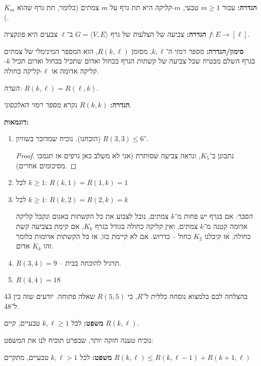 \documentclass[]{article}
\newcommand\ml    {\ell}
\newcommand\ra    {\rangle}
\newcommand\la    {\langle}
\begin{document}
	\textbf{הגדרה: }עבור $m \ge 1$ טבעי, $m$\textit{-קליקה} היא תת גרף על $m$ צמתים (כלומר, תת גרף שהוא $K_m$). 
	
	\textbf{הגדרה: }\textit{צביעה} של הצלעות של גרף $G = \la V, E \ra$ ב־$\ell$ צבעים היא פונקציה $f \colon E \to [\ml]$. 
	
	\textbf{סימון/הגדרה: }\textit{מספר רמזי} ה־$k, \ml$, מסומן $R(k, \ml)$, הוא המספר המינימלי של צמתים בגרף השלם מבטיח שכל צביעה של קשתות הגרף בכחול ואדום שתכיל בכחול ואדום תכיל $k$-קליקה אדומה או $\ml$-קליקה כחולה. 
	
	\textit{הערה: }$R(k, \ml) = R(\ml, k)$. 
	
	\textbf{הגדרה: }$R(k, k)$ נקרא \textit{מספר רמזי האלכסוני}. 
	
	\textbf{דוגמאות: }
	\begin{enumerate}
		\item־$R(3, 3) \le 6$ (הוכחנו). נוכיח שמדובר בשוויון. \begin{proof}
			נתבונן ב־$K_5$, ונראה צביעה שסותרת (אני לא משלב כאן גרפים אז תגמבו מסיכומים אחרים). 
		\end{proof}
		\item לכל $k \ge 1$: 
		$ R(k, 1) = R(1, k) = 1 $
		\item לכל $k \ge 1$:
		$ R(k, 2) = R(2, k) = k $ 
		
		\textit{הסבר: }אם בגרף יש פחות מ־$k$ צמתים, נובל לצבוע את כל הקשתות באגום ונקבל קליקה אדומה קטנה מ־$k$ צמתים, ואין קליקה כחולה בגודל בגרף $K_k$, אם קימת בצביעה קשת כחולה, אז קיבלנו $K_2$ כחול – כדרוש. אם לא קיימת כזו, אז כל הקשתות אדומות כלומר זהו $K_k$ אדום. 
		
		\item $R(3, 4) = 9$ – תרגיל להוכחה בבית.  
		\item $R(4, 4) = 18$
	\end{enumerate}
	בהצלחה לכם בלמצוא נוסחה כללית ל־$R$, כי $R(5, 5)$ שאלה פתוחה. יודעים שזה בין 43 ל־48. 
	
	\textbf{משפט: }לכל $k, \ml \ge 1$ טבעיים, קיים $R(k, \ml)$. 
	
	נוכיח טענה חזקה יותר, שבפרט תוכיח לנו את המשפט: 
	
	\textbf{משפט: }לכל $k, \ml > 1$ טבעיים, מתקיים $R(k, \ml) \le R(k, \ml - 1) + R(k + 1, \ml)$
	
\end{document}
